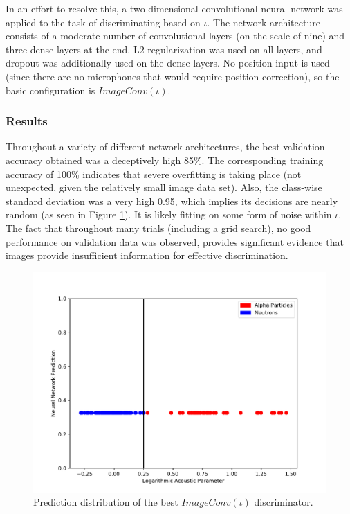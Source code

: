 \documentclass[10pt]{article}
\begin{document}
In an effort to resolve this, a two-dimensional convolutional neural network was applied to the task of discriminating based on $\iota$. The network architecture consists of a moderate number of convolutional layers (on the scale of nine) and three dense layers at the end. L2 regularization was used on all layers, and dropout was additionally used on the dense layers. No position input is used (since there are no microphones that would require position correction), so the basic configuration is $ImageConv(\iota)$.

\subsubsection{Results}

Throughout a variety of different network architectures, the best validation accuracy obtained was a deceptively high 85\%. The corresponding training accuracy of 100\% indicates that severe overfitting is taking place (not unexpected, given the relatively small image data set). Also, the class-wise standard deviation was a very high 0.95, which implies its decisions are nearly random (as seen in Figure \ref{image_hist}). It is likely fitting on some form of noise within $\iota$. The fact that throughout many trials (including a grid search), no good performance on validation data was observed, provides significant evidence that images provide insufficient information for effective discrimination.

\begin{figure}[h]
    \centering
    \includegraphics[width=\textwidth]{image_hist}
    \caption{\label{image_hist} Prediction distribution of the best $ImageConv(\iota)$ discriminator.}
\end{figure}
\end{document}
